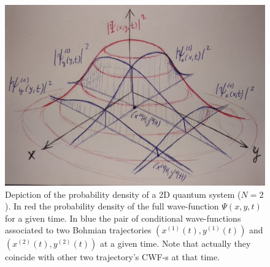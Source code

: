 \documentclass[11pt, a4paper]{article} %
\begin{document}
\begin{figure}[h!]
  \centering
    \includegraphics[width=0.65\linewidth]{slices.jpg}
  \caption{Depiction of the probability density of a 2D quantum system ($N=2$). In red the probability density of the full wave-function $\Psi(x,y,t)$ for a given time. In blue the pair of conditional wave-functions associated to two Bohmian trajectories $(x^{(1)}(t),y^{(1)}(t))$ and $(x^{(2)}(t),y^{(2)}(t))$ at a given time. Note that actually they coincide with other two trajectory's CWF-s at that time. }
  \label{fig:slices}
\end{figure}
\end{document}
